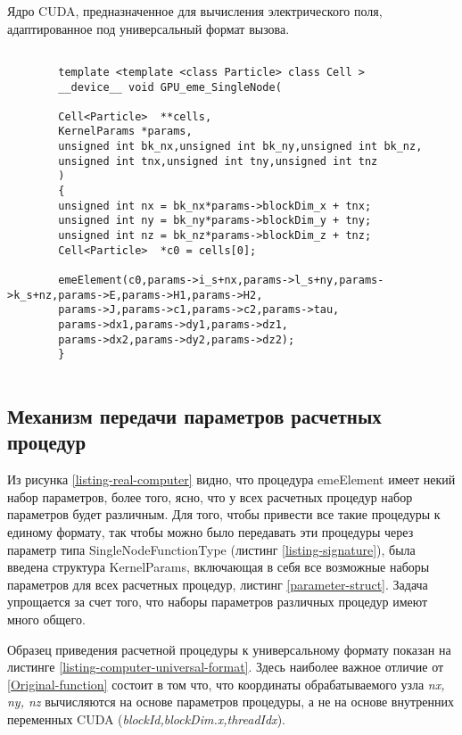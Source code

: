 \begin{ListingEnv}[!h]
	\captiondelim{ } %
	\caption{Ядро CUDA, предназначенное для вычисления электрического поля, адаптированное под универсальный формат вызова.}
	\label{parameter-struct1}	
	\begin{lstlisting}[language={[ISO]C++}]
	
		template <template <class Particle> class Cell >
		__device__ void GPU_eme_SingleNode(
		
		Cell<Particle>  **cells,
		KernelParams *params,
		unsigned int bk_nx,unsigned int bk_ny,unsigned int bk_nz,
		unsigned int tnx,unsigned int tny,unsigned int tnz
		)
		{
		unsigned int nx = bk_nx*params->blockDim_x + tnx;
		unsigned int ny = bk_ny*params->blockDim_y + tny;
		unsigned int nz = bk_nz*params->blockDim_z + tnz;
		Cell<Particle>  *c0 = cells[0];
		
		emeElement(c0,params->i_s+nx,params->l_s+ny,params->k_s+nz,params->E,params->H1,params->H2,
		params->J,params->c1,params->c2,params->tau,
		params->dx1,params->dy1,params->dz1,
		params->dx2,params->dy2,params->dz2);
		}
	
	\end{lstlisting}
	\label{listing-computer-universal-format}
\end{ListingEnv}

\subsection{Механизм передачи параметров расчетных процедур}


Из рисунка \ref{listing-real-computer} видно, что процедура emeElement имеет некий набор параметров, более того, ясно, что у всех расчетных процедур набор параметров будет различным. Для
того, чтобы привести все такие процедуры к единому формату, так чтобы можно было передавать эти процедуры через параметр типа SingleNodeFunctionType (листинг \ref{listing-signature}), была введена структура KernelParams, включающая в себя все возможные наборы параметров для всех расчетных процедур, листинг \ref{parameter-struct}. Задача упрощается за счет того, что наборы параметров различных процедур имеют много общего. 

Образец приведения расчетной процедуры к универсальному формату показан на листинге \ref{listing-computer-universal-format}. Здесь наиболее важное отличие от \ref{Original-function} состоит в том что, что координаты обрабатываемого узла \textit{nx, ny, nz} вычисляются на основе параметров процедуры, а не на основе внутренних переменных CUDA (\textit{blockId,blockDim.x,threadIdx}).

